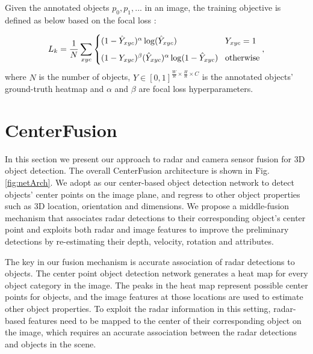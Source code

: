 \documentclass[10pt,twocolumn,letterpaper]{article}
\newcommand\method{CenterFusion}
\begin{document}
   Given the annotated objects ${p_0,p_1,...}$ in an image, the training objective
   is defined as below based on the focal loss \cite{linFocalLossDense2018}:
   
   \small
   \begin{equation*}
       L_{k} = \frac{1}{N} \sum_{xyc}
       \begin{cases}
           (1 - \hat{Y}_{xyc})^{\alpha} 
           \log(\hat{Y}_{xyc}) & \! Y_{xyc}=1\vspace{2mm}\\
           (1-Y_{xyc})^{\beta} 
           (\hat{Y}_{xyc})^{\alpha}\log(1-\hat{Y}_{xyc})
           & \!\text{otherwise}
       \end{cases},
   \end{equation*}
   \normalsize
   where $N$ is the number of objects, 
   $Y \in [0,1]^{\frac{W}{R} \times \frac{H}{R} \times C}$ is the annotated 
   objects' ground-truth heatmap and $\alpha$ and $\beta$ are focal loss 
   hyperparameters.
   
   
   \section{\method{}}
   
   In this section we present our approach to radar and camera sensor fusion for 
   3D object detection. The overall \method{} architecture is
   shown in Fig. \ref{fig:netArch}. We adopt \cite{zhou2019objects} 
   as our center-based object detection network to detect
   objects' center points on the image plane, and regress to other object 
   properties such as 3D location, orientation and dimensions. 
   We propose a middle-fusion mechanism 
   that associates radar detections to their corresponding object's center 
   point and exploits both radar and image features to improve the preliminary
   detections by re-estimating their depth, velocity, rotation and attributes.
   
   The key in our fusion mechanism is accurate association of radar detections 
   to objects. The center point object detection network 
   generates a heat map for every object category in the image. 
   The peaks in the heat map represent possible center points for objects, 
   and the image features at those locations are used to estimate other object 
   properties. To exploit the radar information in this setting, radar-based features
   need to be mapped to the center of their corresponding object on the image,
   which requires an accurate association between the radar detections and objects
   in the scene.
   
\end{document}
